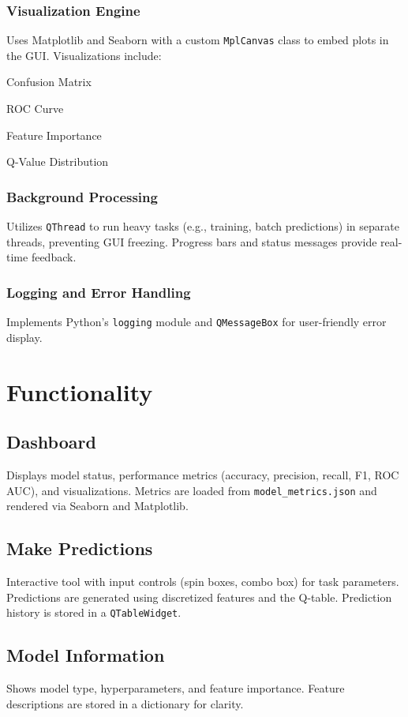 \documentclass[runningheads]{llncs}
\begin{document}
\subsubsection{Visualization Engine}
Uses Matplotlib and Seaborn with a custom \texttt{MplCanvas} class to embed plots in the GUI. Visualizations include:
\item Confusion Matrix
    \item ROC Curve
    \item Feature Importance
    \item Q-Value Distribution

\subsubsection{Background Processing}
Utilizes \texttt{QThread} to run heavy tasks (e.g., training, batch predictions) in separate threads, preventing GUI freezing. Progress bars and status messages provide real-time feedback.

\subsubsection{Logging and Error Handling}
Implements Python's \texttt{logging} module and \texttt{QMessageBox} for user-friendly error display.

\section{Functionality}
\subsection{Dashboard}
Displays model status, performance metrics (accuracy, precision, recall, F1, ROC AUC), and visualizations. Metrics are loaded from \texttt{model\_metrics.json} and rendered via Seaborn and Matplotlib.

\subsection{Make Predictions}
Interactive tool with input controls (spin boxes, combo box) for task parameters. Predictions are generated using discretized features and the Q-table. Prediction history is stored in a \texttt{QTableWidget}.

\subsection{Model Information}
Shows model type, hyperparameters, and feature importance. Feature descriptions are stored in a dictionary for clarity.
\end{document}
